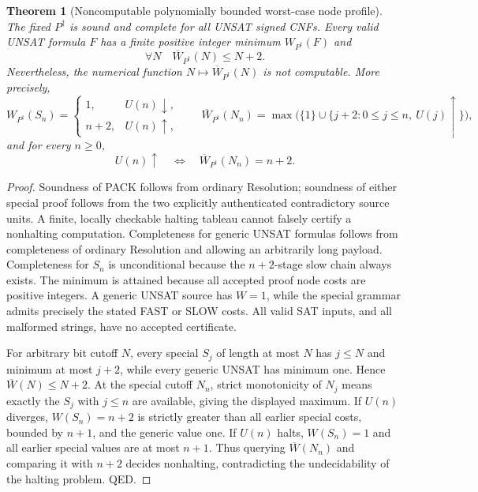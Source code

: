 \documentclass[11pt]{article}
\newtheorem{theorem}{Theorem}
\begin{document}
\begin{theorem}[Noncomputable polynomially bounded worst-case node profile]
The fixed $P^\dagger$ is sound and complete for all UNSAT signed CNFs. Every valid UNSAT formula $F$ has a finite positive integer minimum $W_{P^\dagger}(F)$ and
\[
 \forall N\quad \overline W_{P^\dagger}(N)\le N+2.
\]
Nevertheless, the numerical function $N\mapsto\overline W_{P^\dagger}(N)$ is \emph{not computable}. More precisely,
\[
 W_{P^\dagger}(S_n)=
 \begin{cases}
 1,&U(n)\downarrow,\\
 n+2,&U(n)\uparrow,
 \end{cases}
\qquad
 \overline W_{P^\dagger}(N_n)
 =\max\bigl(\{1\}\cup\{j+2:0\le j\le n,\ U(j)\uparrow\}\bigr),
\]
and for every $n\ge0$,
\[
 \boxed{ U(n)\uparrow\quad\Longleftrightarrow\quad
        \overline W_{P^\dagger}(N_n)=n+2.}
\]
\end{theorem}
\begin{proof}
Soundness of PACK follows from ordinary Resolution; soundness of either special proof follows from the two explicitly authenticated contradictory source units. A finite, locally checkable halting tableau cannot falsely certify a nonhalting computation. Completeness for generic UNSAT formulas follows from completeness of ordinary Resolution and allowing an arbitrarily long payload. Completeness for $S_n$ is unconditional because the $n+2$-stage slow chain always exists. The minimum is attained because all accepted proof node costs are positive integers. A generic UNSAT source has $W=1$, while the special grammar admits precisely the stated FAST or SLOW costs. All valid SAT inputs, and all malformed strings, have no accepted certificate.

For arbitrary bit cutoff $N$, every special $S_j$ of length at most $N$ has $j\le N$ and minimum at most $j+2$, while every generic UNSAT has minimum one. Hence $\overline W(N)\le N+2$. At the special cutoff $N_n$, strict monotonicity of $N_j$ means exactly the $S_j$ with $j\le n$ are available, giving the displayed maximum. If $U(n)$ diverges, $W(S_n)=n+2$ is strictly greater than all earlier special costs, bounded by $n+1$, and the generic value one. If $U(n)$ halts, $W(S_n)=1$ and all earlier special values are at most $n+1$. Thus querying $\overline W(N_n)$ and comparing it with $n+2$ decides nonhalting, contradicting the undecidability of the halting problem. QED.
\end{proof}
\end{document}
